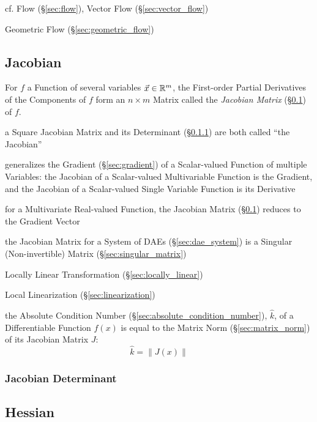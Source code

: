 cf. Flow (\S\ref{sec:flow}), Vector Flow (\S\ref{sec:vector_flow})

Geometric Flow (\S\ref{sec:geometric_flow})



\subsection{Jacobian}\label{sec:jacobian}

For $f$ a Function of several variables $\vec{x} \in \mathbb{R}^m$, the First-order
Partial Derivatives of the Components of $f$ form an $n \times m$ Matrix called
the \emph{Jacobian Matrix} (\S\ref{sec:jacobian}) of $f$.

a Square Jacobian Matrix and its Determinant (\S\ref{sec:jacobian_determinant})
are both called ``the Jacobian''

generalizes the Gradient (\S\ref{sec:gradient}) of a Scalar-valued Function of
multiple Variables: the Jacobian of a Scalar-valued Multivariable Function is
the Gradient, and the Jacobian of a Scalar-valued Single Variable Function is
its Derivative

for a Multivariate Real-valued Function, the Jacobian Matrix
(\S\ref{sec:jacobian}) reduces to the Gradient Vector

\fist the Jacobian Matrix for a System of DAEs (\S\ref{sec:dae_system}) is
a Singular (Non-invertible) Matrix (\S\ref{sec:singular_matrix})

\fist Locally Linear Transformation (\S\ref{sec:locally_linear})

\fist Local Linearization (\S\ref{sec:linearization})

the Absolute Condition Number (\S\ref{sec:absolute_condition_number}),
$\hat{k}$, of a Differentiable Function $f(x)$ is equal to the Matrix Norm
(\S\ref{sec:matrix_norm}) of its Jacobian Matrix $J$:
\[
  \hat{k} = \|J(x)\|
\]



\subsubsection{Jacobian Determinant}\label{sec:jacobian_determinant}



\subsection{Hessian}\label{sec:hessian}

